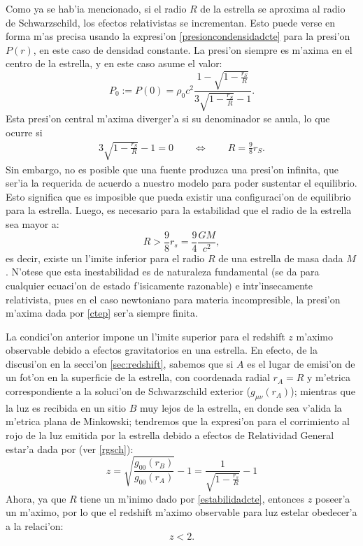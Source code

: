 Como ya se hab'ia mencionado, si el radio $R$ de la estrella se aproxima al radio de Schwarzschild, los efectos relativistas se incrementan. Esto puede verse en forma m'as precisa usando la expresi'on \eqref{presioncondensidadcte} para la presi'on $P(r)$, en este caso de densidad constante. La presi'on siempre es m'axima en el centro de la estrella, y en este caso asume el valor:
\begin{equation}
 P_0:=P(0)=\rho_{0}c^2\frac{1-\sqrt{1-\frac{r_S}{R}}}{3 \sqrt{1-\frac{r_S}{R}}-1}.
\end{equation}
Esta presi'on central m'axima diverger'a si su denominador se anula, lo que ocurre si
\begin{align}
3 \sqrt{1-\frac{r_S}{R}}-1=0 \qquad 
\Leftrightarrow\qquad R=\frac{9}{8}r_S .
\end{align}
Sin embargo, no es posible que una fuente produzca una presi'on infinita, que ser'ia la requerida de acuerdo a nuestro modelo para poder sustentar el equilibrio. Esto significa que es imposible que pueda existir una configuraci'on de equilibrio para la estrella. Luego, es necesario para la estabilidad que el radio de la estrella sea mayor a:
\begin{equation}\label{estabilidadcte}
 \boxed{R>\frac{9}{8}r_s=\frac{9}{4}\frac{GM}{c^2}},
\end{equation}
es decir, existe un l'imite inferior para el radio $R$ de una estrella de masa dada $M$. N'otese que esta inestabilidad es de naturaleza fundamental (se da para cualquier ecuaci'on de estado f'isicamente razonable) e intr'insecamente relativista, pues en el caso newtoniano para materia incompresible, la presi'on m'axima dada por \eqref{ctep} ser'a siempre finita.

La condici'on anterior impone un l'imite superior para el redshift $z$ m'aximo observable debido a efectos gravitatorios en una estrella. En efecto, de la discusi'on en la secci'on \ref{sec:redshift}, sabemos que si $A$ es el lugar de emisi'on de un fot'on en la superficie de la estrella, con coordenada radial $r_A=R$ y m'etrica correspondiente a la soluci'on de Schwarzschild exterior ($g_{\mu\nu}(r_A)$); mientras que la luz es recibida en un sitio $B$ muy lejos de la estrella, en donde sea v'alida la m'etrica plana de Minkowski; tendremos que la expresi'on para el corrimiento al rojo de la luz emitida por la estrella debido a efectos de Relatividad General estar'a dada por  (ver \eqref{rgsch}):
\begin{equation}
 z=\sqrt{\frac{g_{00}(r_B)}{g_{00}(r_A)}}-1=\frac{1}{\sqrt{1-\frac{r_s}{R}}}-1
\end{equation}
Ahora, ya que $R$ tiene un m'inimo dado por \eqref{estabilidadcte}, entonces $z$ poseer'a un m'aximo, por lo que el redshift m'aximo observable para luz estelar obedecer'a a la relaci'on:
\begin{equation}
 z<2.
\end{equation}



